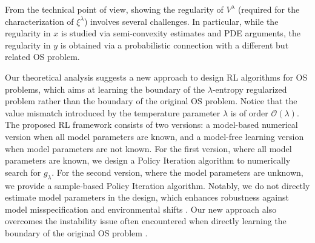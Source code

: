 \documentclass[11pt]{amsart}
\theoremstyle{plain}
\numberwithin{equation}{section}
\begin{document}
From the technical point of view, showing the regularity of $V^\lambda$ (required for the characterization of $\xi^\lambda$) involves several challenges. 
In particular, while the regularity in $x$ is studied via semi-convexity estimates and PDE arguments, the regularity in $y$ is obtained via a probabilistic connection with a different but related OS problem. 
 

Our theoretical analysis suggests a new approach to design RL algorithms for OS problems, which aims at learning the boundary of the $\lambda$-entropy regularized problem rather than the boundary of the original OS problem.
Notice that the value mismatch introduced by the temperature parameter $\lambda$ is of order $\mathcal{O}(\lambda)$.
The proposed RL framework consists of two versions: a model-based numerical version when all model parameters are known, and a model-free learning version when model parameters are not known. For the first version, where all model parameters are known, we design a Policy Iteration algorithm to numerically search for $g_\lambda$. For the second version, where the model parameters are unknown, we provide a sample-based Policy Iteration algorithm. Notably, we do not directly estimate model parameters in the design, which enhances robustness against model misspecification and environmental shifts \cite{agarwal2021theory,fazel2018global,hambly2021policy}. {Our new approach also overcomes the instability issue often encountered when directly learning the boundary of the original OS problem \cite{reppen2022neural}.}
\end{document}

